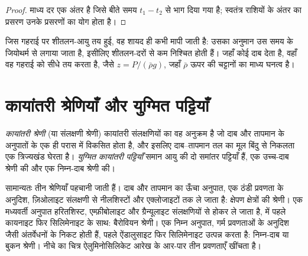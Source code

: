 \begin{proof}
माध्य दर एक अंतर है जिसे बीते समय $t_1 - t_2$ से भाग दिया गया है; स्वतंत्र राशियों के
अंतर का प्रसरण उनके प्रसरणों का योग होता है।
\end{proof}

जिस गहराई पर शीतलन-आयु तय हुई, वह शायद ही कभी मापी जाती है: उसका अनुमान उस समय के
जियोथर्म से लगाया जाता है, इसीलिए  शीतलन-दरों से कम निश्चित होती हैं।
जहाँ कोई  दाब देता है, वहाँ वह गहराई को सीधे तय करता है, जैसे
$z = P/(\bar\rho g)$, जहाँ $\bar\rho$ ऊपर की चट्टानों का माध्य घनत्व है।

\section{कायांतरी श्रेणियाँ और युग्मित पट्टियाँ}\label{sec:b2:pt-paths:series}

\begin{definition}[कायांतरी श्रेणी; युग्मित कायांतरी पट्टियाँ]\label{def:b2:pt-paths:series}
\emph{कायांतरी श्रेणी} (या संलक्षणी श्रेणी) कायांतरी संलक्षणियों का
वह अनुक्रम है जो दाब और तापमान के अनुपातों के एक ही परास में विकसित होता है,
और इसलिए दाब--तापमान तल का मूल बिंदु से निकलता एक त्रिज्यखंड घेरता है।
\emph{युग्मित कायांतरी पट्टियाँ} समान आयु की दो समांतर पट्टियाँ
हैं, एक उच्च-दाब श्रेणी की और एक निम्न-दाब श्रेणी की।
\end{definition}

सामान्यतः तीन श्रेणियाँ पहचानी जाती हैं। दाब और तापमान का ऊँचा अनुपात, एक
ठंडी प्रवणता के अनुदिश, ज़िओलाइट संलक्षणी से नीलशिस्टों और एक्लोजाइटों तक ले जाता है: क्षेपण
क्षेत्रों की श्रेणी। एक मध्यवर्ती अनुपात हरितशिस्ट, एम्फ़ीबोलाइट और
ग्रैन्यूलाइट संलक्षणियों से होकर ले जाता है,  में पहले कायनाइट फिर सिलिमेनाइट के साथ: बैरोवियन श्रेणी। एक निम्न
अनुपात, गर्म प्रवणताओं के अनुदिश जैसी अंतर्वेधनों के निकट होती हैं, पहले ऐंडालुसाइट फिर
सिलिमेनाइट उत्पन्न करता है: निम्न-दाब या बुकन श्रेणी। नीचे का चित्र ऐलुमिनोसिलिकेट आरेख के आर-पार
तीन प्रवणताएँ खींचता है।

